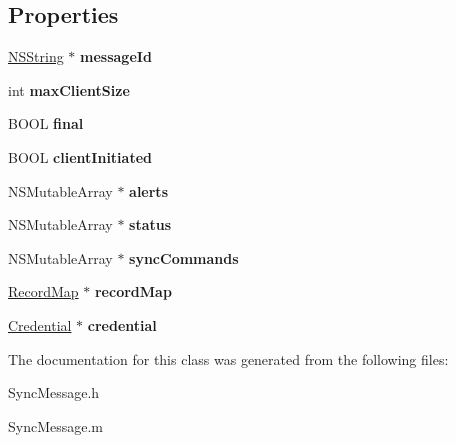 \subsection*{\-Properties}
\begin{DoxyCompactItemize}
\item 
\hypertarget{interface_sync_message_ad0b78ee61dac9c1c6cff05d3780c366f}{
\hyperlink{class_n_s_string}{\-N\-S\-String} $\ast$ {\bfseries message\-Id}}
\label{interface_sync_message_ad0b78ee61dac9c1c6cff05d3780c366f}

\item 
\hypertarget{interface_sync_message_ab2f9b90e643a621ba75e0cb084cfb4d5}{
int {\bfseries max\-Client\-Size}}
\label{interface_sync_message_ab2f9b90e643a621ba75e0cb084cfb4d5}

\item 
\hypertarget{interface_sync_message_a8e550097797eafe27d811883bfb50d63}{
\-B\-O\-O\-L {\bfseries final}}
\label{interface_sync_message_a8e550097797eafe27d811883bfb50d63}

\item 
\hypertarget{interface_sync_message_af94a7474e3e3fcefb700ab32711376bd}{
\-B\-O\-O\-L {\bfseries client\-Initiated}}
\label{interface_sync_message_af94a7474e3e3fcefb700ab32711376bd}

\item 
\hypertarget{interface_sync_message_a298c7c8fa93597484aa05023bab3e328}{
\-N\-S\-Mutable\-Array $\ast$ {\bfseries alerts}}
\label{interface_sync_message_a298c7c8fa93597484aa05023bab3e328}

\item 
\hypertarget{interface_sync_message_a8b3f2df455e9e7f88c6826ebcb0caa7d}{
\-N\-S\-Mutable\-Array $\ast$ {\bfseries status}}
\label{interface_sync_message_a8b3f2df455e9e7f88c6826ebcb0caa7d}

\item 
\hypertarget{interface_sync_message_a022ca7fd27c57d2f473f4a80b201b1ee}{
\-N\-S\-Mutable\-Array $\ast$ {\bfseries sync\-Commands}}
\label{interface_sync_message_a022ca7fd27c57d2f473f4a80b201b1ee}

\item 
\hypertarget{interface_sync_message_ad74bd9818d32261c89c69825adb793f3}{
\hyperlink{interface_record_map}{\-Record\-Map} $\ast$ {\bfseries record\-Map}}
\label{interface_sync_message_ad74bd9818d32261c89c69825adb793f3}

\item 
\hypertarget{interface_sync_message_a3a818b8e15c1cfca6fe31e4c95c04694}{
\hyperlink{interface_credential}{\-Credential} $\ast$ {\bfseries credential}}
\label{interface_sync_message_a3a818b8e15c1cfca6fe31e4c95c04694}

\end{DoxyCompactItemize}


\-The documentation for this class was generated from the following files\-:\begin{DoxyCompactItemize}
\item 
\-Sync\-Message.\-h\item 
\-Sync\-Message.\-m\end{DoxyCompactItemize}
